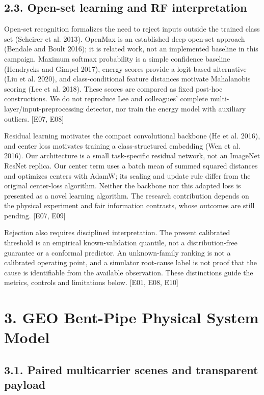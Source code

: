 \documentclass[
  10pt,
]{article}
\begin{document}
\subsection{2.3. Open-set learning and RF
interpretation}\label{open-set-learning-and-rf-interpretation}

Open-set recognition formalizes the need to reject inputs outside the
trained class set (Scheirer et al. 2013). OpenMax is an established deep
open-set approach (Bendale and Boult 2016); it is related work, not an
implemented baseline in this campaign. Maximum softmax probability is a
simple confidence baseline (Hendrycks and Gimpel 2017), energy scores
provide a logit-based alternative (Liu et al. 2020), and
class-conditional feature distances motivate Mahalanobis scoring (Lee et
al. 2018). These scores are compared as fixed post-hoc constructions. We
do not reproduce Lee and colleagues' complete
multi-layer/input-preprocessing detector, nor train the energy model
with auxiliary outliers. {[}E07, E08{]}

Residual learning motivates the compact convolutional backbone (He et
al. 2016), and center loss motivates training a class-structured
embedding (Wen et al. 2016). Our architecture is a small task-specific
residual network, not an ImageNet ResNet replica. Our center term uses a
batch mean of summed squared distances and optimizes centers with AdamW;
its scaling and update rule differ from the original center-loss
algorithm. Neither the backbone nor this adapted loss is presented as a
novel learning algorithm. The research contribution depends on the
physical experiment and fair information contrasts, whose outcomes are
still pending. {[}E07, E09{]}

Rejection also requires disciplined interpretation. The present
calibrated threshold is an empirical known-validation quantile, not a
distribution-free guarantee or a conformal predictor. An unknown-family
ranking is not a calibrated operating point, and a simulator root-cause
label is not proof that the cause is identifiable from the available
observation. These distinctions guide the metrics, controls and
limitations below. {[}E01, E08, E10{]}

\section{3. GEO Bent-Pipe Physical System
Model}\label{geo-bent-pipe-physical-system-model}

\subsection{3.1. Paired multicarrier scenes and transparent
payload}\label{paired-multicarrier-scenes-and-transparent-payload}
\end{document}
